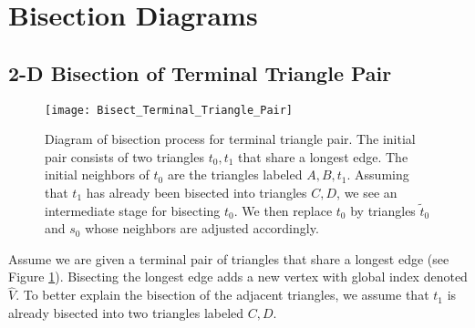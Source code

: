 
\section{Bisection Diagrams}

\subsection{2-D Bisection of Terminal Triangle Pair}

\begin{figure}
\begin{center}

  





\texttt{[image: Bisect\_Terminal\_Triangle\_Pair]}
\caption{Diagram of bisection process for terminal triangle pair.  The initial pair consists of two triangles $t_0, t_1$ that share a longest edge.  The initial neighbors of $t_0$ are the triangles labeled $A, B, t_1$.  Assuming that $t_1$ has already been bisected into triangles $C, D$, we see an intermediate stage for bisecting $t_0$.  We then replace $t_0$ by triangles $\tilde{t}_0$ and $s_0$ whose neighbors are adjusted accordingly.} \label{fig:Bisect_Terminal_Pair_2D}
\end{center}
\end{figure}

Assume we are given a terminal pair of triangles that share a longest edge (see Figure \ref{fig:Bisect_Terminal_Pair_2D}).  Bisecting the longest edge adds a new vertex with global index denoted $\widehat{V}$.  To better explain the bisection of the adjacent triangles, we assume that $t_1$ is already bisected into two triangles labeled $C, D$.

